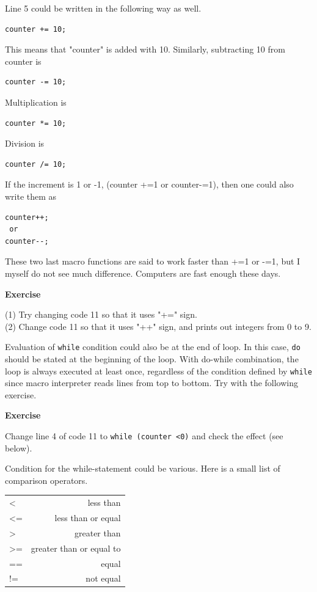 \documentclass[11pt,a4paper,oneside]{report}
\newenvironment{indentexercise}[1]%
{{\setlength{\leftmargin}{2em}}%
\textbf{Exercise \thesubsection-#1}%
\begin{list}{}%
	\item%
}
{\end{list}}
\newenvironment{indentCom}%
{\begin{list}{}%
         {\setlength{\leftmargin}{1em}}%
         \item[]%
}
{\end{list}}
\newcommand{\ilcom}[1]{\texttt{\small#1}}
\begin{document}
Line 5 could be written in the following way as well.
\begin{lstlisting}[numbers=none]
counter += 10;
\end{lstlisting}
This means that "counter" is added with 10. Similarly, subtracting 10 from counter is 
\begin{lstlisting}[numbers=none]
counter -= 10;
\end{lstlisting}
Multiplication is 
\begin{lstlisting}[numbers=none]
counter *= 10;
\end{lstlisting}
Division is
\begin{lstlisting}[numbers=none]
counter /= 10;
\end{lstlisting}
If the increment is 1 or -1, (counter +=1 or counter-=1), then one could also write them  as 
\begin{lstlisting}[numbers=none]
counter++;
 or 
counter--;
\end{lstlisting}
These two last macro functions are said to work faster than +=1 or -=1, but I myself do not see much difference. Computers are fast enough these days. 

\begin{indentexercise}{1}
(1) Try changing code 11 so that it uses "+=" sign.\\
(2) Change code 11 so that it uses "++" sign, and prints out integers from 0 to 9.\\
\end{indentexercise}
Evaluation of \ilcom{while} condition could also be at the end of loop. In this case, \ilcom{do} should be stated at the beginning of the loop. With do-while combination, the loop is always executed at least once, regardless of the condition defined by \ilcom{while} since macro interpreter reads lines from top to bottom. Try with the following exercise.

\begin{indentexercise}{2}
Change line 4 of code 11 to \ilcom{while (counter <0)} and check the effect (see below).
\end{indentexercise}



Condition for the while-statement could be various. Here is a small list of comparison operators.

\begin{indentCom}
 \begin{tabular*}{0.5\textwidth}{ l r }
< & less than \\
<= & less than or equal\\ 
> & greater than\\ 
>= & greater than or equal to\\
== & equal\\
!= & not equal\\
 \end{tabular*}
\end{indentCom}
\end{document}
